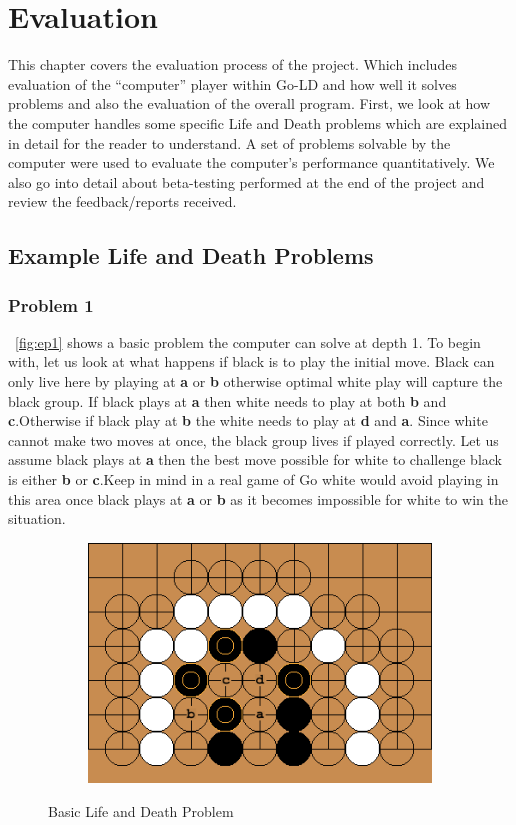 \documentclass{l4proj}
\newcommand{\bo}[1]{\textbf{#1}}
\begin{document}
\chapter{Evaluation}

This chapter covers the evaluation process of the project. Which includes evaluation of the “computer” player within Go-LD and how well it solves problems and also the evaluation of the overall program.  First, we look at how the computer handles some specific Life and Death problems which are explained in detail for the reader to understand. A set of problems solvable by the computer were used to evaluate the computer’s performance quantitatively. We also go into detail about beta-testing performed at the end of the project and review the feedback/reports received.

\section{Example Life and Death Problems}
\subsection{Problem 1}
~\autoref{fig:ep1}  shows a basic problem the computer can solve at depth 1. To begin with, let us look at what happens if black is to play the initial move. Black can only live here by playing at \bo{a} or \bo{b} otherwise optimal white play will capture the black group. If black plays at \bo{a} then white needs to play at both \bo{b} and \bo{c}.Otherwise if black play at \bo{b} the white needs to play at \bo{d} and \bo{a}. Since white cannot make two moves at once, the black group lives if played correctly. Let us assume black plays at \bo{a} then the best move possible for white to challenge black is either \bo{b} or \bo{c}.Keep in mind in a real game of Go white would avoid playing in this area once black plays at \bo{a} or \bo{b} as it becomes impossible for white to win the situation.
\begin{figure}[!ht]
\centering
\begin{subfigure}[b]{0.8\textwidth}
\includegraphics[width=\textwidth]{ep1/1.png}
\end{subfigure}
\caption{Basic Life and Death Problem}
\label{fig:ep1}
\end{figure}
\end{document}
